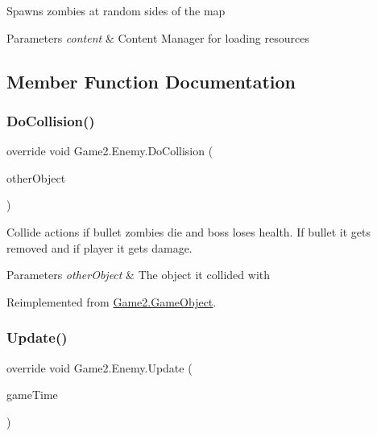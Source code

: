 Spawns zombies at random sides of the map 


\begin{DoxyParams}{Parameters}
{\em content} & Content Manager for loading resources\\
\hline
\end{DoxyParams}


\subsection{Member Function Documentation}
\mbox{\label{class_game2_1_1_enemy_a574b0e99f86ce3a5e126484518020dac}} 
\subsubsection{\texorpdfstring{Do\+Collision()}{DoCollision()}}
{\footnotesize\ttfamily override void Game2.\+Enemy.\+Do\+Collision (\begin{DoxyParamCaption}\item[{\mbox{\hyperlink{class_game2_1_1_game_object}{Game\+Object}}}]{other\+Object }\end{DoxyParamCaption})\hspace{0.3cm}{\ttfamily [virtual]}}



Collide actions if bullet zombies die and boss loses health. If bullet it gets removed and if player it gets damage. 


\begin{DoxyParams}{Parameters}
{\em other\+Object} & The object it collided with\\
\hline
\end{DoxyParams}


Reimplemented from \mbox{\hyperlink{class_game2_1_1_game_object_aa811d23c405b9aa28ab922901d0a3002}{Game2.\+Game\+Object}}.

\mbox{\label{class_game2_1_1_enemy_a5e3fdb40fb9884bda064eb671896d264}} 
\subsubsection{\texorpdfstring{Update()}{Update()}}
{\footnotesize\ttfamily override void Game2.\+Enemy.\+Update (\begin{DoxyParamCaption}\item[{Game\+Time}]{game\+Time }\end{DoxyParamCaption})\hspace{0.3cm}{\ttfamily [virtual]}}



